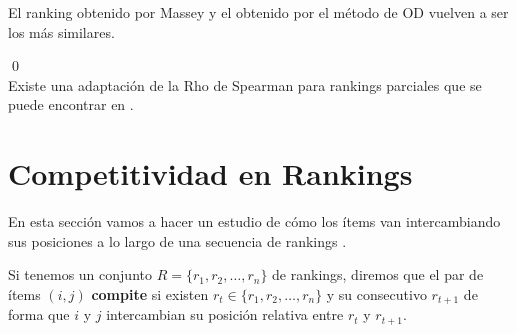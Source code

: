 	El ranking obtenido por Massey y el obtenido por el método de OD vuelven a ser los más similares.
	
\qed
\ \\
Existe una adaptación de la Rho de Spearman para rankings parciales que se puede encontrar en \cite[págs 207-211]{libro_rankings}.

\section{Competitividad en Rankings}
En esta sección vamos a hacer un estudio de cómo los ítems van intercambiando sus posiciones a lo largo de una secuencia de rankings \cite{refcomp}.\\

\begin{defi} Si tenemos un conjunto $R=\{r_{1},r_{2},\dots,r_{n}\}$ de rankings, diremos que el par de ítems $(i,j)$ \textbf{compite} si existen $r_{t} \in \{r_{1},r_{2},\dots,r_{n}\}$ y su consecutivo $r_{t+1}$ de forma que $i$ y $j$ intercambian su posición relativa entre $r_{t}$ y $r_{t+1}$.
\end{defi}

